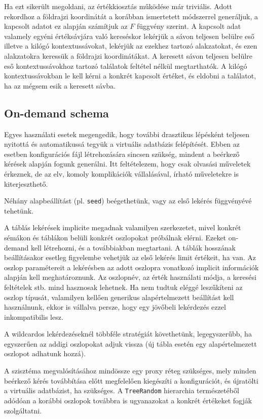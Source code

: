 \documentclass[
    parspace,
    noindent,
    nohyp,
]{elteiktdk}[2023/04/10]
\begin{document}
Ha ezt sikerült megoldani, az értékkiosztás működése már triviális.
Adott rekordhoz a földrajzi koordinátát a korábban ismertetett módszerrel generáljuk,
a kapcsolt adatot ez alapján számítjuk az $F$ függvény szerint.
A kapcsolt adat valamely egyéni értéksávjára való kereséskor
lekérjük a sávon teljesen belülre eső illetve a kilógó kontextussávokat,
lekérjük az ezekhez tartozó alakzatokat,
és ezen alakzatokra keressük a földrajzi koordinátákat.
A keresett sávon teljesen belülre eső kontextussávokhoz tartozó találatok feltétel nélkül megtarthatók.
A kilógó kontextussávokban le kell kérni a konkrét kapcsolt értéket,
és eldobni a találatot, ha az mégsem esik a keresett sávba.

\subsection{On-demand schema}

Egyes használati esetek megengedik,
hogy további drasztikus lépésként teljesen nyitottá és automatikussá tegyük a virtuális adatbázis felépítését.
Ebben az esetben konfigurációs fájl létrehozására sincsen szükség,
mindent a beérkező kérések alapján fogunk generálni.
Itt feltételezem, hogy csak olvasási műveletek érkeznek,
de az elv, komoly komplikációk vállalásával, írható műveletekre is kiterjeszthető.

Néhány alapbeállítást (pl. \texttt{seed}) beégethetünk, vagy az első lekérés függvényévé tehetünk.

A táblás lekérések implicite megadnak valamilyen szerkezetet,
mivel konkrét sémákon és táblákon belüli konkrét oszlopokat próbálnak elérni.
Ezeket on-demand kell létrehozni, és a továbbiakban megtartani.
A táblák hosszának beállításakor esetleg figyelembe vehetjük az első lekérés limit értékeit, ha van.
Az oszlop paramétereit a lekérésben az adott oszlopra vonatkozó
implicit információk alapján kell meghatároznunk.
Az oszlopnév, az érték használati módja, a keresési feltételek stb.
mind hasznosak lehetnek.
Ha nem tudtuk eléggé leszűkíteni az oszlop típusát,
valamilyen kellően generikus alapértelmezett beállítást kell használnunk,
ekkor is vállalva persze, hogy egy jövőbeli lekérdezés ezzel inkompatibilis lesz.

A wildcardos lekérdezéseknél többféle stratégiát követhetünk,
legegyszerűbb, ha egyszerűen az addigi oszlopokat adjuk vissza
(új tábla esetén egy alapértelmezett oszlopot adhatunk hozzá).

A szisztéma megvalósításához mindössze egy proxy réteg szükséges,
mely minden beérkező kérés továbbítása előtt megfelelően kiegészíti a konfigurációt,
és újratölti a virtuális adatbázist, ha szükséges.
A \texttt{TreeRandom} hierarchia természetéből adódóan a korábbi oszlopok
továbbra is ugyanazokat a konkrét értékeket fogják szolgáltatni.
\end{document}
